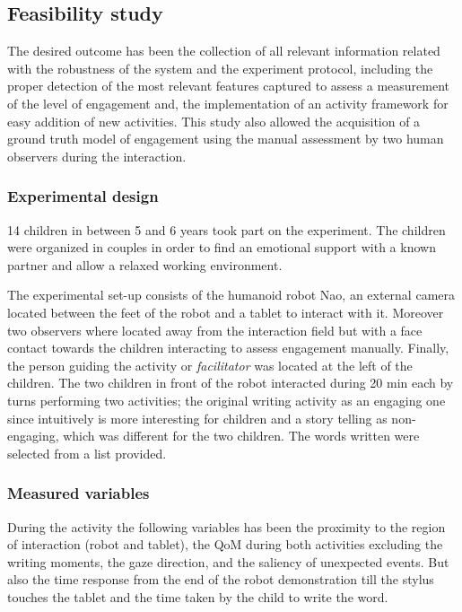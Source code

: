 \documentclass[a4paper, 10pt, conference]{ieeeconf}      %
\begin{document}
\subsection{Feasibility study}

The desired outcome has been the collection of all relevant information related with the robustness of the system and the experiment protocol, including the proper detection of the most relevant features captured to assess a measurement of the level of engagement and, the implementation of an activity framework for easy addition of new activities. This study also allowed the acquisition of a ground truth model of engagement using the manual assessment by two human observers during the interaction.

\subsubsection{Experimental design}

14 children in between 5 and 6 years took part on the experiment. The children were organized in couples in order to find an emotional support with a known partner and allow a relaxed working environment.

The experimental set-up consists of the humanoid robot Nao, an external camera located between the feet of the robot and a tablet to interact with it. Moreover two observers where located away from the interaction field but with a face contact towards the children interacting to assess engagement manually. Finally, the person guiding the activity or \textit{facilitator} was located at the left of the children. The two children in front of the robot interacted during 20 min each by turns performing two activities; the original writing activity as an engaging one since intuitively is more interesting for children and a story telling as non-engaging, which was different for the two children. The words written were selected from a list provided.

\subsubsection{Measured variables} \label{measuredVariables}
During the activity the following variables has been the proximity to the region of interaction (robot and tablet), the QoM during both activities excluding the writing moments, the gaze direction, and the saliency of unexpected events. But also the time response from the end of the robot demonstration till the stylus touches the tablet and the time taken by the child to write the word.
	
\end{document}
